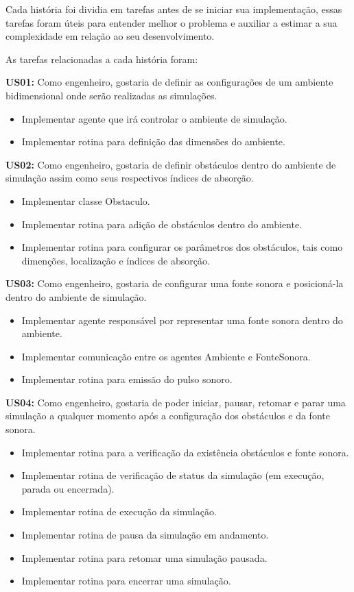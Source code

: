 Cada história foi dividia em tarefas antes de se iniciar sua implementação, essas tarefas foram úteis para entender melhor o problema e auxiliar a estimar a sua complexidade em relação ao seu desenvolvimento.

As tarefas relacionadas a cada história foram:

\textbf{US01:} Como engenheiro, gostaria de definir as configurações de um ambiente bidimensional onde serão realizadas as simulações.

\begin{itemize}
\item Implementar agente que irá controlar o ambiente de simulação.
\item Implementar rotina para definição das dimensões do ambiente.
\end{itemize}

\textbf{US02:} Como engenheiro, gostaria de definir obstáculos dentro do ambiente de simulação assim como seus respectivos índices de absorção.

\begin{itemize}
\item Implementar classe Obstaculo.
\item Implementar rotina para adição de obstáculos dentro do ambiente.
\item Implementar rotina para configurar os parâmetros dos obstáculos, tais como dimenções, localização e índices de absorção.
\end{itemize}

\textbf{US03:} Como engenheiro, gostaria de configurar uma fonte sonora e posicioná-la dentro do ambiente de simulação.

\begin{itemize}
\item Implementar agente responsável por representar uma fonte sonora dentro do ambiente.
\item Implementar comunicação entre os agentes Ambiente e FonteSonora.
\item Implementar rotina para emissão do pulso sonoro.
\end{itemize}
	
\textbf{US04:} Como engenheiro, gostaria de poder iniciar, pausar, retomar e parar uma simulação a qualquer momento após a configuração dos obstáculos e da fonte sonora.

\begin{itemize}
\item Implementar rotina para a verificação da existência obstáculos e fonte sonora.
\item Implementar rotina de verificação de status da simulação (em execução, parada ou encerrada).
\item Implementar rotina de execução da simulação.
\item Implementar rotina de pausa da simulação em andamento.
\item Implementar rotina para retomar uma simulação pausada.
\item Implementar rotina para encerrar uma simulação.
\end{itemize}
	
